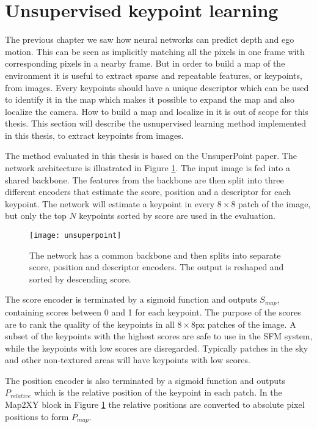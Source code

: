 \section{Unsupervised keypoint learning}

The previous chapter we saw how neural networks can predict depth and ego motion. This can be seen as implicitly matching all the pixels in one frame with corresponding pixels in a nearby frame. But in order to build a map of the environment it is useful to extract sparse and repeatable features, or keypoints, from images. Every keypoints should have a unique descriptor which can be used to identify it in the map which makes it possible to expand the map and also localize the camera. How to build a map and localize in it is out of scope for this thesis. This section will describe the usnupervised learning method implemented in this thesis, to extract keypoints from images.

The method evaluated in this thesis is based on the UnsuperPoint paper\cite{unsuperpoint}. The network architecture is illustrated in Figure \ref{fig:unsuperpoint}. The input image is fed into a shared backbone. The features from the backbone are then split into three different encoders that estimate the score, position and a descriptor for each keypoint. The network will estimate a keypoint in every $8\times 8$ patch of the image, but only the top $N$ keypoints sorted by score are used in the evaluation.

\begin{figure}[H]
	\centering
	\texttt{[image: unsuperpoint]}
	\caption{The network has a common backbone and then splits into separate score, position and descriptor encoders. The output is reshaped and sorted by descending score.}
	\label{fig:unsuperpoint}
\end{figure}

The score encoder is terminated by a sigmoid function and outputs $S_{map}$, containing scores between 0 and 1 for each keypoint. The purpose of the scores are to rank the quality of the keypoints in all $8\times 8$px patches of the image. A subset of the keypoints with the highest scores are safe to use in the SFM system, while the keypoints with low scores are disregarded. Typically patches in the sky and other non-textured areas will have keypoints with low scores.

The position encoder is also terminated by a sigmoid function and outputs $P_{relative}$ which is the relative position of the keypoint in each patch. In the Map2XY block in Figure \ref{fig:unsuperpoint} the relative positions are converted to absolute pixel positions to form $P_{map}$.

